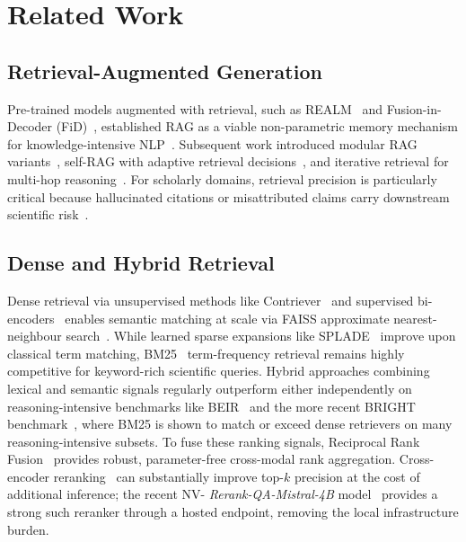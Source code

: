 \documentclass[journal]{IEEEtran}
\begin{document}
\section{Related Work}
\label{sec:related}

\subsection{Retrieval-Augmented Generation}
Pre-trained models augmented with retrieval, such as
REALM~\cite{guu2020realm} and Fusion-in-Decoder
(FiD)~\cite{izacard2021fid}, established RAG as a viable
non-parametric memory mechanism for knowledge-intensive
NLP~\cite{lewis2020rag}. Subsequent work introduced modular RAG
variants~\cite{gao2023modular}, self-RAG with adaptive retrieval
decisions~\cite{asai2023selfrag}, and iterative retrieval for
multi-hop reasoning~\cite{trivedi2022interleaving}. For scholarly
domains, retrieval precision is particularly critical because
hallucinated citations or misattributed claims carry downstream
scientific risk~\cite{khalifa2023sourcenli}.

\subsection{Dense and Hybrid Retrieval}
Dense retrieval via unsupervised methods like
Contriever~\cite{izacard2022contriever} and supervised
bi-encoders~\cite{karpukhin2020dpr,muennighoff2023mteb} enables
semantic matching at scale via FAISS approximate nearest-neighbour
search~\cite{johnson2019faiss}. While learned sparse expansions like
SPLADE~\cite{formal2021splade} improve upon classical term matching,
BM25~\cite{robertson2009probabilistic} term-frequency retrieval
remains highly competitive for keyword-rich scientific queries. Hybrid
approaches combining lexical and semantic signals regularly outperform
either independently on reasoning-intensive benchmarks like
BEIR~\cite{thakur2021beir} and the more recent BRIGHT
benchmark~\cite{su2024bright}, where BM25 is shown to match or exceed
dense retrievers on many reasoning-intensive subsets. To fuse these
ranking signals, Reciprocal Rank Fusion~\cite{cormack2009rrf} provides
robust, parameter-free cross-modal rank aggregation. Cross-encoder
reranking~\cite{nogueira2019passage} can substantially improve
top-$k$ precision at the cost of additional inference; the recent NV-
\emph{Rerank-QA-Mistral-4B} model~\cite{nvidia2024rerankqa} provides a
strong such reranker through a hosted endpoint, removing the local
infrastructure burden.
\end{document}
